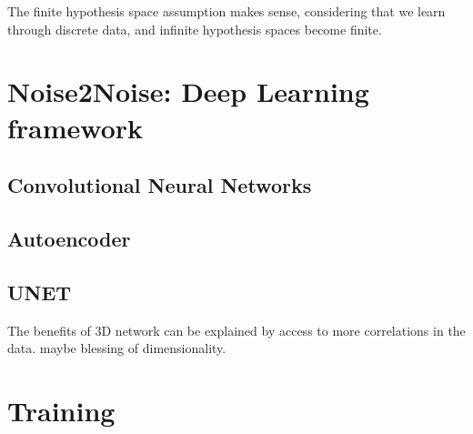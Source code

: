 The finite hypothesis space assumption makes sense, considering that we learn through discrete data, and infinite hypothesis spaces become finite. 


\section{Noise2Noise: Deep Learning framework}





\subsection{Convolutional Neural Networks}
\subsection{Autoencoder}
\cite{goodfellowDeepLearning2016}
\subsection{UNET}


The benefits of 3D network can be explained by access to more correlations in the data. maybe blessing of dimensionality.

\section{Training}

